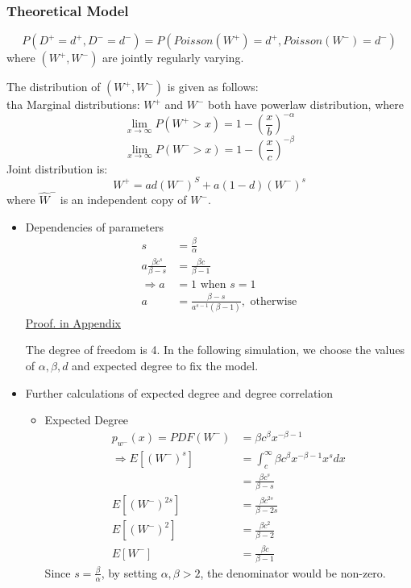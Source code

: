\documentclass{article}
\begin{document}
		\subsubsection{Theoretical Model}
$$P(D^+ = d^+, D^- = d^-) = P(Poisson(W^+) = d^+, Poisson(W^-)=d^-)$$
where $(W^+,W^-)$  are jointly regularly varying. 
\par The distribution of $(W^+,W^-)$ is given as follows: \\ tha
Marginal distributions:
		$W^+$ and $W^-$ both have powerlaw distribution, where
$$\lim_{x \rightarrow \infty}  P(W^+ > x) =1-(\frac{x}{b})^{-\alpha}$$
$$\lim_{x \rightarrow \infty}  P(W^- > x) = 1-(\frac{x}{c})^{- \beta} $$
Joint distribution is:
$$ W^+ = ad(W^-)^S+a(1-d)(W^-)^s$$
where  $\hat{W}^-$ is an independent copy of $W^-$.
\\
\begin{itemize}
\item Dependencies of parameters\\
\begin{align*}
s &= \frac{\beta}{\alpha}\\
a\frac{\beta c^s}{\beta -s}&=\frac{\beta c}{\beta -1}\\
\Rightarrow 
 a &= 1 \text{ when } s=1 \\
a&=\frac{\beta - s}{a^{s-1}(\beta-1)}, \text{ otherwise}
\end{align*}
\hyperlink{pf_of_dependency}{Proof. in Appendix}

\par The degree of freedom is 4. In the following simulation, we choose the values of $\alpha, \beta, d$ and expected degree to fix the model.

\item Further calculations of expected degree and degree correlation\\
	\begin{itemize}
		\item Expected Degree
		\begin{align*}
p_{w^-}(x)=PDF(W^-) &= \beta c^\beta x^{-\beta - 1}\\
\Rightarrow
E[(W^-)^s]&=\int_c ^\infty \beta c^\beta x^{-\beta - 1}x^sdx
\\ &=\frac{\beta c^s}{\beta -s}\\
E[(W^-)^{2s}]&=\frac{\beta c^{2s}}{\beta -2s}\\
E[(W^-)^2]&=\frac{\beta c^2}{\beta -2}\\
E[W^-]&=\frac{\beta c}{\beta -1}
\end{align*}
Since $s=\frac{\beta}{\alpha}$, by setting $\alpha, \beta > 2$, the denominator would be non-zero.
	

\end{itemize}
\end{itemize}
\end{document}
